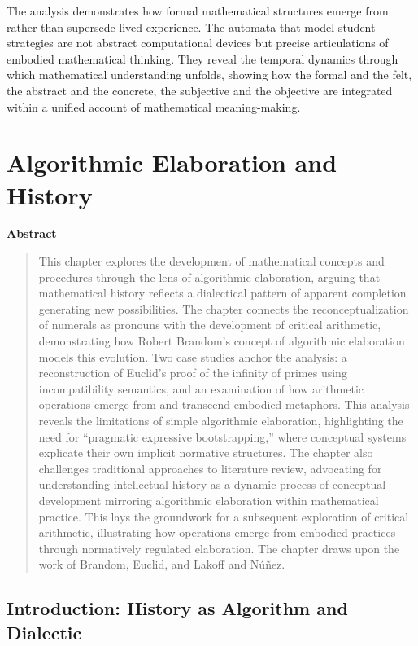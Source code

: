 \documentclass[12pt]{book}
\newenvironment{abstract}
    { %
      \begin{center} %
        \textbf{Abstract} %
      \end{center}
      \vspace{\baselineskip} %
      \begin{quotation} %
      \small %
    }
    { %
      \end{quotation} %
      \bigskip %
    }
\begin{document}
The analysis demonstrates how formal mathematical structures emerge from rather than supersede lived experience. The automata that model student strategies are not abstract computational devices but precise articulations of embodied mathematical thinking. They reveal the temporal dynamics through which mathematical understanding unfolds, showing how the formal and the felt, the abstract and the concrete, the subjective and the objective are integrated within a unified account of mathematical meaning-making.




\chapter{Algorithmic Elaboration and History}

\begin{abstract}
This chapter explores the development of mathematical concepts and
procedures through the lens of algorithmic elaboration, arguing that
mathematical history reflects a dialectical pattern of apparent
completion generating new possibilities. The chapter connects the
reconceptualization of numerals as pronouns with the development of
critical arithmetic, demonstrating how Robert Brandom's concept of
algorithmic elaboration models this evolution. Two case studies anchor
the analysis: a reconstruction of Euclid's proof of the infinity of
primes using incompatibility semantics, and an examination of how
arithmetic operations emerge from and transcend embodied metaphors. This
analysis reveals the limitations of simple algorithmic elaboration,
highlighting the need for ``pragmatic expressive bootstrapping,'' where
conceptual systems explicate their own implicit normative structures.
The chapter also challenges traditional approaches to literature review,
advocating for understanding intellectual history as a dynamic process
of conceptual development mirroring algorithmic elaboration within
mathematical practice. This lays the groundwork for a subsequent
exploration of critical arithmetic, illustrating how operations emerge
from embodied practices through normatively regulated elaboration. The
chapter draws upon the work of Brandom, Euclid, and Lakoff and Núñez.

\end{abstract}


\section{Introduction: History as Algorithm and Dialectic}
\end{document}
